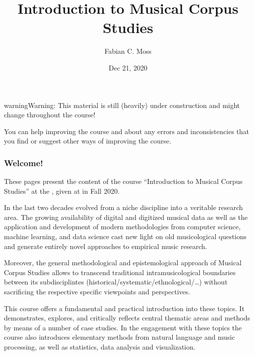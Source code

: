 \documentclass[letterpaper,10pt,english]{sphinxmanual}
\title{Introduction to Musical Corpus Studies}
\date{Dec 21, 2020}
\author{Fabian C.\@{} Moss}
\begin{document}
\pagestyle{empty}
\sphinxmaketitle
\pagestyle{plain}
\sphinxtableofcontents
\pagestyle{normal}
\label{\detokenize{index::doc}}



\begin{sphinxadmonition}{warning}{Warning:}
This material is still (heavily) under construction and might change throughout the course!

You can help improving the course and  about any errors and inconsistencies that you find
or suggest other ways of improving the course.
\end{sphinxadmonition}
\subsubsection*{Welcome!}

These pages present the content of the course “Introduction to Musical Corpus Studies” at the ,
given at  in Fall 2020.

In the last two decades  evolved from a niche discipline into a veritable research area.
The growing availability of digital and digitized musical data as well as the application and development of modern
methodologies from computer science, machine learning, and data science cast new light on old musicological questions
and generate entirely novel approaches to empirical music research.

Moreover, the general methodological and epistemological approach of Musical Corpus Studies allows to transcend traditional
intra\sphinxhyphen{}musicological boundaries between its sub\sphinxhyphen{}disciplintes (historical/systematic/ethnological/…) without sacrificing the
respective specific viewpoints and perspectives.

This course offers a fundamental and practical introduction into these topics.
It demonstrates, explores, and critically reflects central thematic areas and methods by means of a number of case studies.
In the engagement with these topics the course also introduces elementary methods from natural language and music processing,
as well as statistics, data analysis and visualization.
\end{document}

